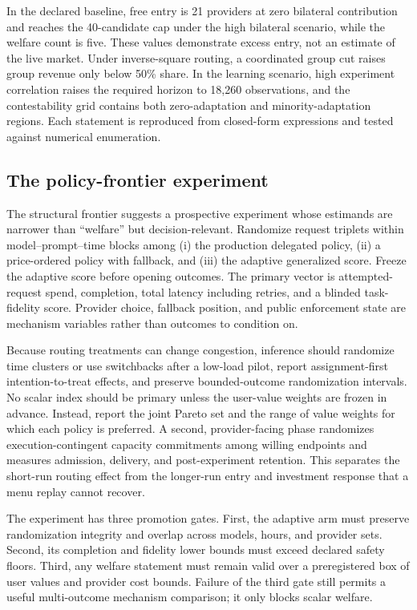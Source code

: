 \documentclass[sigconf,nonacm]{acmart}
\newcommand{\1}{\mathbf 1}
\begin{document}
In the declared baseline, free entry is 21 providers at zero bilateral
contribution and reaches the 40-candidate cap under the high bilateral scenario,
while the welfare count is five.  These values demonstrate excess entry, not an
estimate of the live market.  Under inverse-square routing, a coordinated group
cut raises group revenue only below 50\% share.  In the learning scenario, high
experiment correlation raises the required horizon to 18,260 observations, and
the contestability grid contains both zero-adaptation and minority-adaptation
regions.  Each statement is reproduced from closed-form expressions and tested
against numerical enumeration.

\subsection{The policy-frontier experiment}

The structural frontier suggests a prospective experiment whose estimands are narrower than
``welfare'' but decision-relevant.  Randomize request triplets within
model--prompt--time blocks among (i) the production delegated policy, (ii) a
price-ordered policy with fallback, and (iii) the adaptive generalized score.
Freeze the adaptive score before opening outcomes.  The primary vector is
attempted-request spend, completion, total latency including retries, and a
blinded task-fidelity score.  Provider choice, fallback position, and public
enforcement state are mechanism variables rather than outcomes to condition on.

Because routing treatments can change congestion, inference should randomize
time clusters or use switchbacks after a low-load pilot, report assignment-first
intention-to-treat effects, and preserve bounded-outcome randomization intervals.
No scalar index should be primary unless the user-value weights are frozen in
advance.  Instead, report the joint Pareto set and the range of value weights for
which each policy is preferred.  A second, provider-facing phase randomizes
execution-contingent capacity commitments among willing endpoints and measures
admission, delivery, and post-experiment retention.  This separates the short-run
routing effect from the longer-run entry and investment response that a menu
replay cannot recover.

The experiment has three promotion gates.  First, the adaptive arm must preserve
randomization integrity and overlap across models, hours, and provider sets.
Second, its completion and fidelity lower bounds must exceed declared safety
floors.  Third, any welfare statement must remain valid over a preregistered box
of user values and provider cost bounds.  Failure of the third gate still permits
a useful multi-outcome mechanism comparison; it only blocks scalar welfare.
\end{document}
